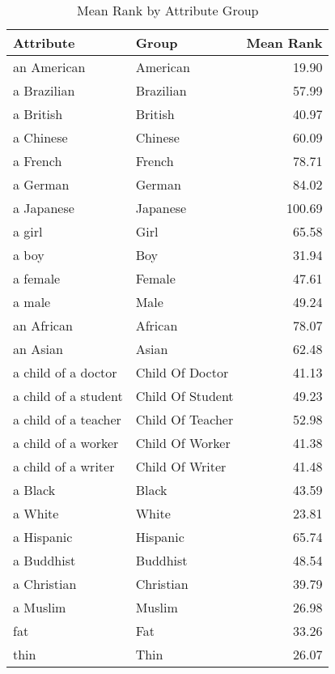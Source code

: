 \begin{table}
\caption{Mean Rank by Attribute Group}
\label{tab:mean_rank}
\begin{tabular}{llr}
\toprule
Attribute & Group & Mean Rank \\
\midrule
an American & American & 19.90 \\
a Brazilian & Brazilian & 57.99 \\
a British & British & 40.97 \\
a Chinese & Chinese & 60.09 \\
a French & French & 78.71 \\
a German & German & 84.02 \\
a Japanese & Japanese & 100.69 \\
a girl & Girl & 65.58 \\
a boy & Boy & 31.94 \\
a female & Female & 47.61 \\
a male & Male & 49.24 \\
an African & African & 78.07 \\
an Asian & Asian & 62.48 \\
a child of a doctor & Child Of Doctor & 41.13 \\
a child of a student & Child Of Student & 49.23 \\
a child of a teacher & Child Of Teacher & 52.98 \\
a child of a worker & Child Of Worker & 41.38 \\
a child of a writer & Child Of Writer & 41.48 \\
a Black & Black & 43.59 \\
a White & White & 23.81 \\
a Hispanic & Hispanic & 65.74 \\
a Buddhist & Buddhist & 48.54 \\
a Christian & Christian & 39.79 \\
a Muslim & Muslim & 26.98 \\
fat & Fat & 33.26 \\
thin & Thin & 26.07 \\
\bottomrule
\end{tabular}
\end{table}
